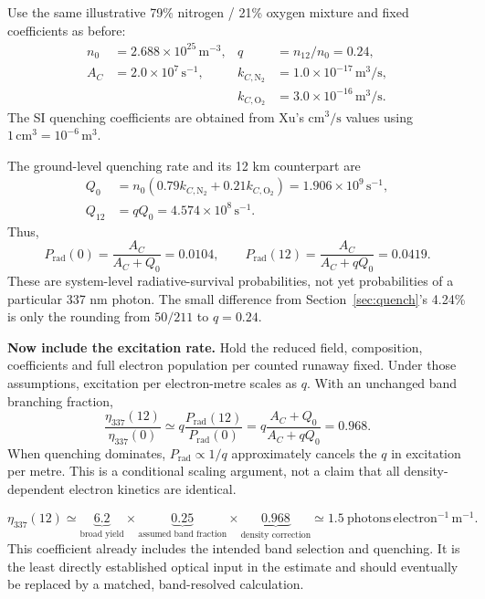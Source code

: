 \documentclass[11pt,a4paper]{article}
\newcommand{\xu}[1]{\cite[#1]{Xu2015}}
\begin{document}
Use the same illustrative 79\% nitrogen / 21\% oxygen mixture and fixed coefficients as before:
\begin{align*}
 n_0&=2.688\times10^{25}\,\mathrm{m^{-3}},& q&=n_{12}/n_0=0.24,\\
 A_C&=2.0\times10^7\,\mathrm{s^{-1}},&
 k_{C,\mathrm{N}_2}&=1.0\times10^{-17}\,\mathrm{m^3/s},\\
 &&k_{C,\mathrm{O}_2}&=3.0\times10^{-16}\,\mathrm{m^3/s}.
\end{align*}
The SI quenching coefficients are obtained from Xu's $\mathrm{cm^3/s}$ values using $1\,\mathrm{cm^3}=10^{-6}\,\mathrm{m^3}$.\xu{Sec.~2.2}

The ground-level quenching rate and its 12 km counterpart are
\begin{align*}
 Q_0&=n_0\left(0.79k_{C,\mathrm{N}_2}+0.21k_{C,\mathrm{O}_2}\right)
      =1.906\times10^9\,\mathrm{s^{-1}},\\
 Q_{12}&=qQ_0=4.574\times10^8\,\mathrm{s^{-1}}.
\end{align*}
Thus,
\[
 P_{\mathrm{rad}}(0)=\frac{A_C}{A_C+Q_0}=0.0104,\qquad
 P_{\mathrm{rad}}(12)=\frac{A_C}{A_C+qQ_0}=0.0419.
\]
These are system-level radiative-survival probabilities, not yet probabilities of a particular 337 nm photon. The small difference from Section~\ref{sec:quench}'s 4.24\% is only the rounding from $50/211$ to $q=0.24$.

\textbf{Now include the excitation rate.} Hold the reduced field, composition, coefficients and full electron population per counted runaway fixed. Under those assumptions, excitation per electron-metre scales as $q$. With an unchanged band branching fraction,
\begin{equation}
 \boxed{
 \frac{\eta_{337}(12)}{\eta_{337}(0)}
 \simeq q\frac{P_{\mathrm{rad}}(12)}{P_{\mathrm{rad}}(0)}
 =q\frac{A_C+Q_0}{A_C+qQ_0}=0.968.}
 \label{eq:yieldaltitude}
\end{equation}
When quenching dominates, $P_{\mathrm{rad}}\propto1/q$ approximately cancels the $q$ in excitation per metre. This is a conditional scaling argument, not a claim that all density-dependent electron kinetics are identical.

\begin{keybox}
\[
 \eta_{337}(12)\simeq
 \underbrace{6.2}_{\text{broad yield}}\times
 \underbrace{0.25}_{\text{assumed band fraction}}\times
 \underbrace{0.968}_{\text{density correction}}
 \simeq1.5\ \mathrm{photons\,electron^{-1}\,m^{-1}}.
\]
This coefficient already includes the intended band selection and quenching. It is the least directly established optical input in the estimate and should eventually be replaced by a matched, band-resolved calculation.
\end{keybox}
\end{document}
